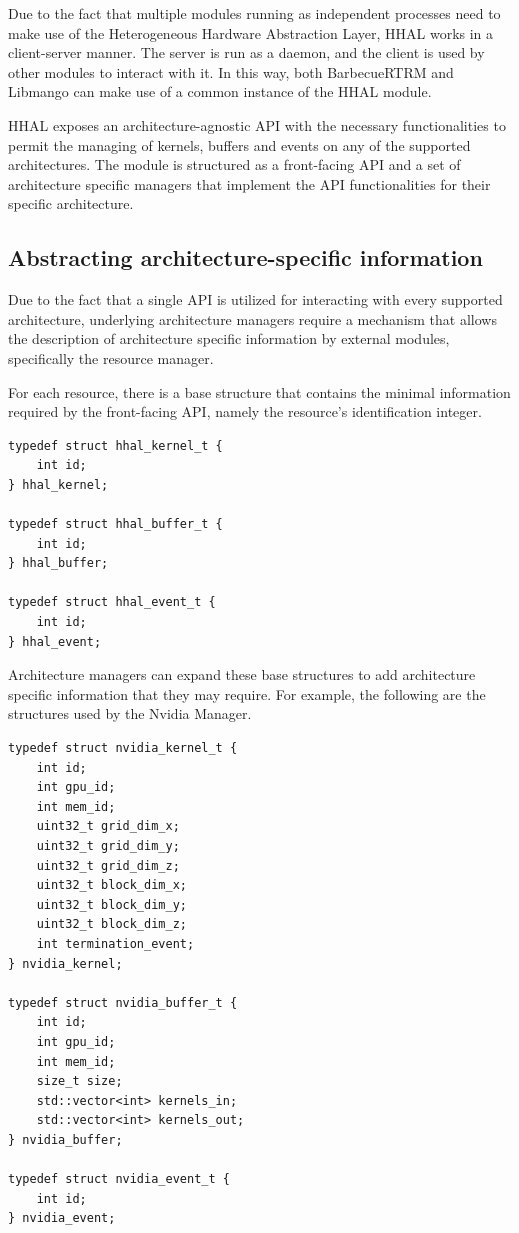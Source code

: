 Due to the fact that multiple modules running as independent processes need to make use of the Heterogeneous Hardware Abstraction Layer, HHAL works in a client-server manner. The server is run as a daemon, and the client is used by other modules to interact with it. In this way, both BarbecueRTRM and Libmango can make use of a common instance of the HHAL module.

HHAL exposes an architecture-agnostic API with the necessary functionalities to permit the managing of kernels, buffers and events on any of the supported architectures. The module is structured as a front-facing API and a set of architecture specific managers that implement the API functionalities for their specific architecture.

\subsection{Abstracting architecture-specific information}

Due to the fact that a single API is utilized for interacting with every supported architecture, underlying architecture managers require a mechanism that allows the description of architecture specific information by external modules, specifically the resource manager.

For each resource, there is a base structure that contains the minimal information required by the front-facing API, namely the resource's identification integer. 

\begin{lstlisting}[style=CStyle, caption=HHAL API - Base structures]
typedef struct hhal_kernel_t {
    int id;
} hhal_kernel;

typedef struct hhal_buffer_t {
    int id;
} hhal_buffer;

typedef struct hhal_event_t {
    int id;
} hhal_event;
\end{lstlisting}

Architecture managers can expand these base structures to add architecture specific information that they may require. For example, the following are the structures used by the Nvidia Manager.

\begin{lstlisting}[style=CStyle, label={HHAL:NvidiaStructs}, caption=HHAL Nvidia Manager - Extended structures]
typedef struct nvidia_kernel_t {
    int id;
    int gpu_id;
    int mem_id;
    uint32_t grid_dim_x;
    uint32_t grid_dim_y;
    uint32_t grid_dim_z;
    uint32_t block_dim_x;
    uint32_t block_dim_y;
    uint32_t block_dim_z;
    int termination_event;
} nvidia_kernel;

typedef struct nvidia_buffer_t {
    int id;
    int gpu_id;
    int mem_id;
    size_t size;
    std::vector<int> kernels_in;
    std::vector<int> kernels_out;
} nvidia_buffer;

typedef struct nvidia_event_t {
    int id;
} nvidia_event;
\end{lstlisting}

